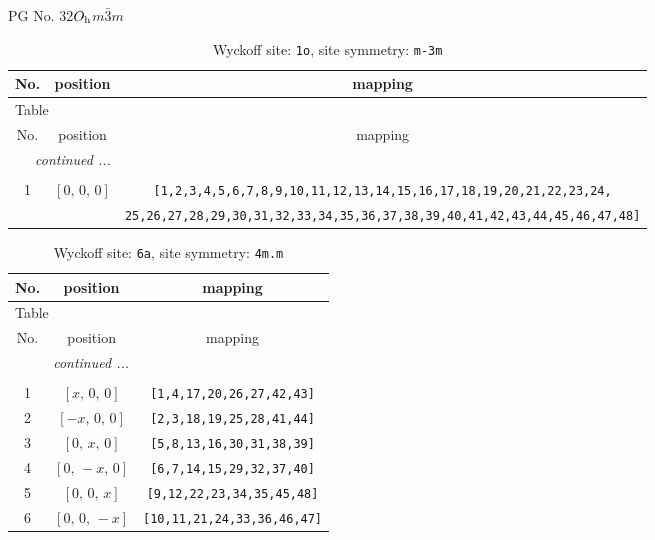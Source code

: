 \documentclass[fleqn,8pt]{jsarticle}
\begin{document}
\setcounter{MaxMatrixCols}{32}

\renewcommand{\tablename}{Table~}
\renewcommand{\figurename}{Figure~}
\begin{center}
\LARGE
PG No. 32\quad$O_{\rm h}$\quad$m\bar{3}m$\quad[ cubic ]
\end{center}
\renewcommand{\arraystretch}{1.2}
\begin{longtable}{ccc}
\caption{Wyckoff site: {\tt 1o}, site symmetry: {\tt m-3m}}
 \\
 \hline \hline
No. & position & mapping \\ \hline \endfirsthead

\multicolumn{2}{l}{\tablename\ \thetable{}} \\
 \hline \hline
No. & position & mapping \\ \hline \endhead

 \hline \hline
\multicolumn{2}{r}{\footnotesize\it continued ...} \\ \endfoot

 \hline \hline
\multicolumn{2}{r}{} \\ \endlastfoot

1 & $\left[ 0,\, 0,\, 0 \right]$ & {\tt [1,2,3,4,5,6,7,8,9,10,11,12,13,14,15,16,17,18,19,20,21,22,23,24,} \\ \hline
 &  & {\tt 25,26,27,28,29,30,31,32,33,34,35,36,37,38,39,40,41,42,43,44,45,46,47,48]} \\
\end{longtable}
\renewcommand{\arraystretch}{1.2}
\begin{longtable}{ccc}
\caption{Wyckoff site: {\tt 6a}, site symmetry: {\tt 4m.m}}
 \\
 \hline \hline
No. & position & mapping \\ \hline \endfirsthead

\multicolumn{2}{l}{\tablename\ \thetable{}} \\
 \hline \hline
No. & position & mapping \\ \hline \endhead

 \hline \hline
\multicolumn{2}{r}{\footnotesize\it continued ...} \\ \endfoot

 \hline \hline
\multicolumn{2}{r}{} \\ \endlastfoot

1 & $\left[ x,\, 0,\, 0 \right]$ & {\tt [1,4,17,20,26,27,42,43]} \\ \hline
2 & $\left[ - x,\, 0,\, 0 \right]$ & {\tt [2,3,18,19,25,28,41,44]} \\ \hline
3 & $\left[ 0,\, x,\, 0 \right]$ & {\tt [5,8,13,16,30,31,38,39]} \\ \hline
4 & $\left[ 0,\, - x,\, 0 \right]$ & {\tt [6,7,14,15,29,32,37,40]} \\ \hline
5 & $\left[ 0,\, 0,\, x \right]$ & {\tt [9,12,22,23,34,35,45,48]} \\ \hline
6 & $\left[ 0,\, 0,\, - x \right]$ & {\tt [10,11,21,24,33,36,46,47]} \\
\end{longtable}
\end{document}
